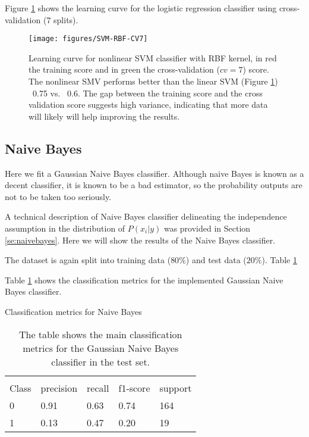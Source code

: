 \documentclass[11pt]{article}
\theoremstyle{definition}
\theoremstyle{remark}
\begin{document}
{Figure \ref{fig:svm-cv7} shows the learning curve for the logistic regression classifier using cross-validation (7 splits).
\begin{figure}[H]
        \centering
        \texttt{[image: figures/SVM-RBF-CV7]}
        \caption{Learning curve for nonlinear SVM classifier with RBF kernel, in red the training score and in green the cross-validation ($cv=7$) score. The nonlinear SMV performs better than the linear SVM (Figure \ref{fig:svm-cv7}) ~0.75 vs. ~0.6. The gap between the training score and the cross validation score suggests high variance, indicating that more data will likely will help improving the results. 
        } \label{fig:svm-cv7}
\end{figure}

\subsection{Naive Bayes}
\label{se:resnaivebayes}

Here we fit a Gaussian Naive Bayes classifier. Although naive Bayes is known as a decent classifier, it is known to be a bad estimator, so the probability outputs are not to be taken too seriously. %

A technical description of Naive Bayes classifier delineating the independence assumption in the distribution of $P(x_i | y)$ was provided in Section \ref{se:naivebayes}. Here we will show the results of the Naive Bayes classifier.

The dataset is again split into training data ($80\%$) and test data ($20\%$). Table \ref{tab:naive}

Table \ref{tab:naive} shows the classification metrics for the implemented Gaussian Naive Bayes classifier.
\begin{table}[H]
\caption{Classification metrics for Naive Bayes} 
\begin{center} 
\begin{tabular}{lllll}
\hline
\multicolumn{1}{c}{} \\
Class & precision & recall & f1-score & support     \\
\hline
0 & 0.91  &    0.63   &   0.74   &    164 \\
1 & 0.13  &    0.47   &   0.20   &    19 \\
\hline
\end{tabular}
\caption{The table shows the main classification metrics for the Gaussian Naive Bayes classifier in the test set.} \label{tab:naive} 
\end{center}
\end{table}

}
\end{document}

